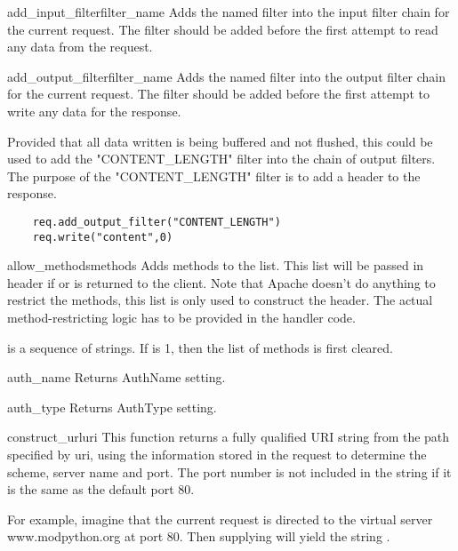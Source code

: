 \begin{methoddesc}[request]{add_input_filter}{filter_name}
  Adds the named filter into the input filter chain for the current request.
  The filter should be added before the first attempt to read any data from
  the request.
\end{methoddesc}

\begin{methoddesc}[request]{add_output_filter}{filter_name}
  Adds the named filter into the output filter chain for the current request.
  The filter should be added before the first attempt to write any data for
  the response.

  Provided that all data written is being buffered and not flushed, this
  could be used to add the "CONTENT_LENGTH" filter into the chain of
  output filters. The purpose of the "CONTENT_LENGTH" filter is to add a
   header to the response.

  \begin{verbatim}
    req.add_output_filter("CONTENT_LENGTH")
    req.write("content",0)
  \end{verbatim}                              

\end{methoddesc}

\begin{methoddesc}[request]{allow_methods}{methods}
  Adds methods to the  list. This list
  will be passed in  header if
   or 
  is returned to the client. Note that Apache doesn't do anything to
  restrict the methods, this list is only used to construct the
  header. The actual method-restricting logic has to be provided in the
  handler code.

   is a sequence of strings. If  is 1, then
  the list of methods is first cleared.
\end{methoddesc}

\begin{methoddesc}[request]{auth_name}{}
  Returns AuthName setting.
\end{methoddesc}

\begin{methoddesc}[request]{auth_type}{}
  Returns AuthType setting.
\end{methoddesc}

\begin{methoddesc}[request]{construct_url}{uri}
  This function returns a fully qualified URI string from the path specified
  by uri, using the information stored in the request to determine the scheme,
  server name and port. The port number is not included in the string if it
  is the same as the default port 80.

  For example, imagine that the current request is directed to the virtual
  server www.modpython.org at port 80. Then supplying  will
  yield the string .

\end{methoddesc}

